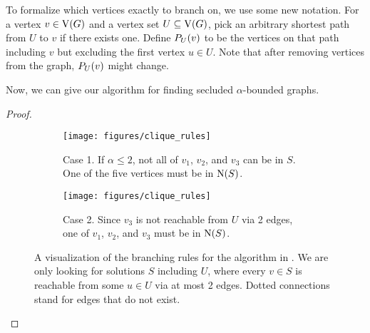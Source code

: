 \begin{lemma}
To formalize which vertices exactly to branch on, we use some new notation. For a vertex $v \in \operatorname{V}({G})$ and a vertex set $U \subseteq \operatorname{V}({G})$, pick an arbitrary shortest path from $U$ to $v$ if there exists one. Define $P_{U}({v})$ to be the vertices on that path including $v$ but excluding the first vertex $u \in U$. Note that after removing vertices from the graph, $P_{U}({v})$ might change.

Now, we can give our algorithm for finding secluded $\alpha$-bounded graphs. 

\restateab*
\iflong
\begin{proof}
    \begin{figure}[t]
      \centering \hfill
      \begin{subfigure}{0.48\textwidth} \centering
        \texttt{[image: figures/clique\_rules]}
        \caption{Case 1. If $\alpha \le 2$, not all of $v_1$, $v_2$, and $v_3$ can be in $S$. One of the five vertices must be in $\operatorname{N}({S})$.}
      \end{subfigure} \hfill
      \begin{subfigure}{0.48\textwidth} \centering
        \texttt{[image: figures/clique\_rules]}
        \caption{Case 2. Since $v_3$ is not reachable from $U$ via 2 edges, one of $v_1$, $v_2$, and $v_3$ must be in $\operatorname{N}({S})$.}
      \end{subfigure} \hfill
      \caption{A visualization of the branching rules for the \abounded{} algorithm in . We are only looking for solutions $S$ including $U$, where every $v \in S$ is reachable from some $u \in U$ via at most 2 edges. Dotted connections stand for edges that do not exist.}\label{fig:alpha}
    \end{figure}


\end{proof}
\end{lemma}
